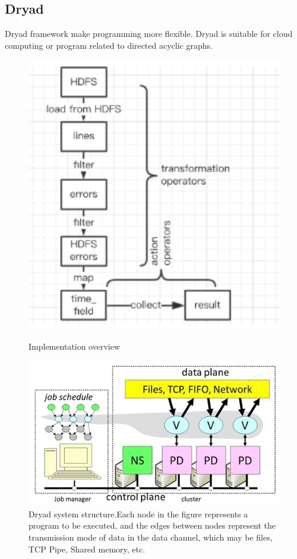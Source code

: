 \documentclass[journal]{IEEEtran}
\begin{document}
\subsection{Dryad}
Dryad framework\cite{Dryad} make programming more flexible. Dryad is suitable for cloud computing or program related to directed acyclic graphs.
\begin{figure}
	\begin{center}
		\begin{minipage}[c]{0.25\textwidth}
			\centering
			\includegraphics[width = 1\textwidth]{2.png}
			\centering
			\caption{Implementation overview}
			\label{figure2}
		\end{minipage}%
		\begin{minipage}[c]{0.25\textwidth} 
			\includegraphics[width = 1\textwidth]{4.png}
			\caption{Dryad system structure.Each node in the figure represents a program to be executed, and the edges between nodes represent the transmission mode of data in the data channel, which may be files, TCP Pipe, Shared memory, etc.}
			\label{figure3}
		\end{minipage}
	\end{center}
\end{figure} 
\end{document}
